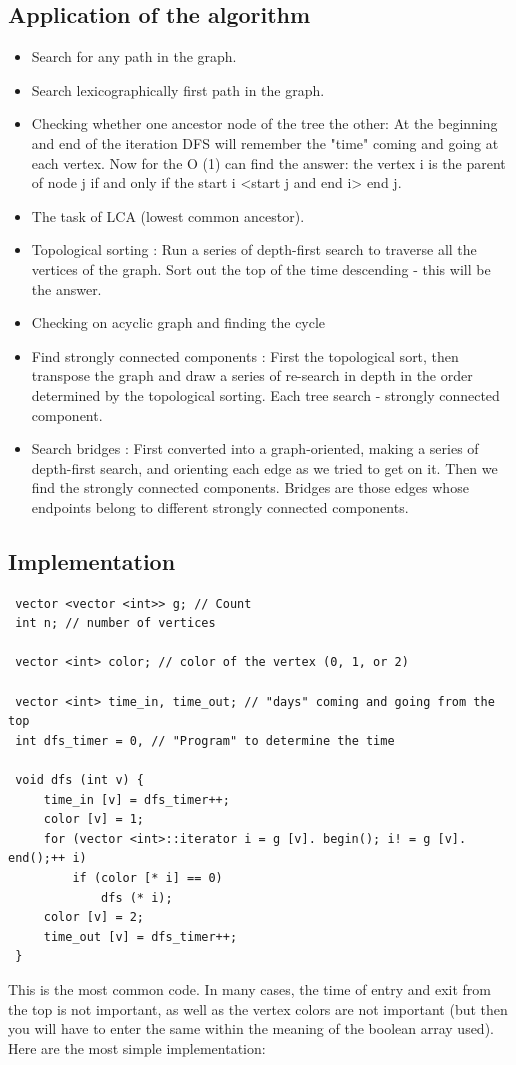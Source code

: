 \subsection{ Application of the algorithm }
\begin{itemize}

\item Search for any path in the graph.
\item Search lexicographically first path in the graph.
\item Checking whether one ancestor node of the tree the other: 
At the beginning and end of the iteration DFS will remember the "time" coming and going at each vertex. Now for the O (1) can find the answer: the vertex i is the parent of node j if and only if the start i <start j and end i> end j.
\item The task of LCA (lowest common ancestor).
\item Topological sorting : 
Run a series of depth-first search to traverse all the vertices of the graph. Sort out the top of the time descending - this will be the answer.
\item Checking on acyclic graph and finding the cycle
\item Find strongly connected components : 
First the topological sort, then transpose the graph and draw a series of re-search in depth in the order determined by the topological sorting. Each tree search - strongly connected component.
\item Search bridges : 
First converted into a graph-oriented, making a series of depth-first search, and orienting each edge as we tried to get on it. Then we find the strongly connected components. Bridges are those edges whose endpoints belong to different strongly connected components.
\end{itemize}

\subsection{ Implementation }

\begin{verbatim}
 vector <vector <int>> g; // Count
 int n; // number of vertices

 vector <int> color; // color of the vertex (0, 1, or 2)

 vector <int> time_in, time_out; // "days" coming and going from the top
 int dfs_timer = 0, // ​​"Program" to determine the time

 void dfs (int v) {
     time_in [v] = dfs_timer++;
     color [v] = 1;
     for (vector <int>::iterator i = g [v]. begin(); i! = g [v]. end();++ i)
         if (color [* i] == 0)
             dfs (* i);
     color [v] = 2;
     time_out [v] = dfs_timer++;
 } 
\end{verbatim}
This is the most common code. In many cases, the time of entry and exit from the top is not important, as well as the vertex colors are not important (but then you will have to enter the same within the meaning of the boolean array used). Here are the most simple implementation:

